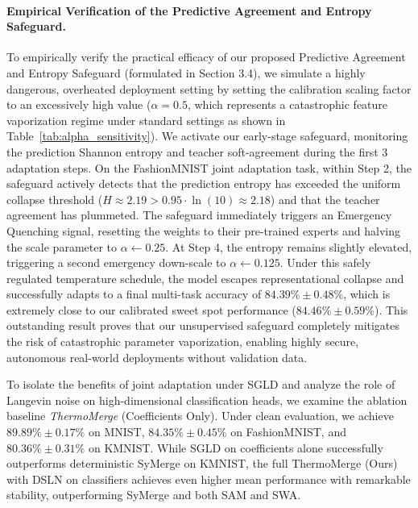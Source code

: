 \paragraph{Empirical Verification of the Predictive Agreement and Entropy Safeguard.} To empirically verify the practical efficacy of our proposed Predictive Agreement and Entropy Safeguard (formulated in Section 3.4), we simulate a highly dangerous, overheated deployment setting by setting the calibration scaling factor to an excessively high value ($\alpha = 0.5$, which represents a catastrophic feature vaporization regime under standard settings as shown in Table~\ref{tab:alpha_sensitivity}).
We activate our early-stage safeguard, monitoring the prediction Shannon entropy and teacher soft-agreement during the first 3 adaptation steps.
On the FashionMNIST joint adaptation task, within Step 2, the safeguard actively detects that the prediction entropy has exceeded the uniform collapse threshold ($H \approx 2.19 > 0.95 \cdot \ln(10) \approx 2.18$) and that the teacher agreement has plummeted.
The safeguard immediately triggers an Emergency Quenching signal, resetting the weights to their pre-trained experts and halving the scale parameter to $\alpha \leftarrow 0.25$.
At Step 4, the entropy remains slightly elevated, triggering a second emergency down-scale to $\alpha \leftarrow 0.125$.
Under this safely regulated temperature schedule, the model escapes representational collapse and successfully adapts to a final multi-task accuracy of $84.39\% \pm 0.48\%$, which is extremely close to our calibrated sweet spot performance ($84.46\% \pm 0.59\%$).
This outstanding result proves that our unsupervised safeguard completely mitigates the risk of catastrophic parameter vaporization, enabling highly secure, autonomous real-world deployments without validation data.

To isolate the benefits of joint adaptation under SGLD and analyze the role of Langevin noise on high-dimensional classification heads, we examine the ablation baseline \emph{ThermoMerge} (Coefficients Only).
Under clean evaluation, we achieve $89.89\% \pm 0.17\%$ on MNIST, $84.35\% \pm 0.45\%$ on FashionMNIST, and $80.36\% \pm 0.31\%$ on KMNIST.
While SGLD on coefficients alone successfully outperforms deterministic SyMerge on KMNIST, the full ThermoMerge (Ours) with DSLN on classifiers achieves even higher mean performance with remarkable stability, outperforming SyMerge and both SAM and SWA.

